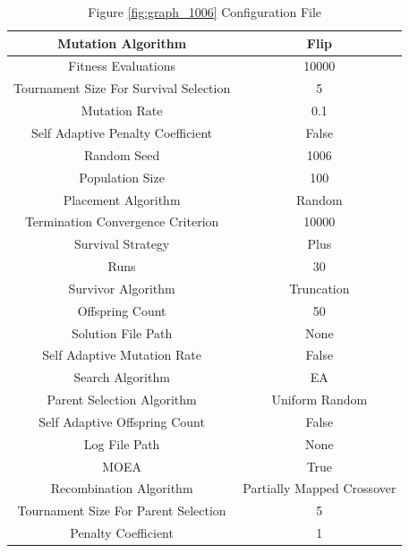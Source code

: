 \documentclass{standalone}
\begin{document}
\begin{table}[!htb]
	\centering
	\caption{Figure \ref{fig:graph_1006} Configuration File}
	\label{tab:graph_1006}
	\begin{tabular}{| c | c |}
		\hline
		Mutation Algorithm		& Flip		 \\
		\hline
		Fitness Evaluations		& 10000		 \\
		\hline
		Tournament Size For Survival Selection		& 5		 \\
		\hline
		Mutation Rate		& 0.1		 \\
		\hline
		Self Adaptive Penalty Coefficient		& False		 \\
		\hline
		Random Seed		& 1006		 \\
		\hline
		Population Size		& 100		 \\
		\hline
		Placement Algorithm		& Random		 \\
		\hline
		Termination Convergence Criterion		& 10000		 \\
		\hline
		Survival Strategy		& Plus		 \\
		\hline
		Runs		& 30		 \\
		\hline
		Survivor Algorithm		& Truncation		 \\
		\hline
		Offspring Count		& 50		 \\
		\hline
		Solution File Path		& None		 \\
		\hline
		Self Adaptive Mutation Rate		& False		 \\
		\hline
		Search Algorithm		& EA		 \\
		\hline
		Parent Selection Algorithm		& Uniform Random		 \\
		\hline
		Self Adaptive Offspring Count		& False		 \\
		\hline
		Log File Path		& None		 \\
		\hline
		MOEA		& True		 \\
		\hline
		Recombination Algorithm		& Partially Mapped Crossover		 \\
		\hline
		Tournament Size For Parent Selection		& 5		 \\
		\hline
		Penalty Coefficient		& 1		 \\
		\hline
	\end{tabular}
\end{table}
\end{document}
